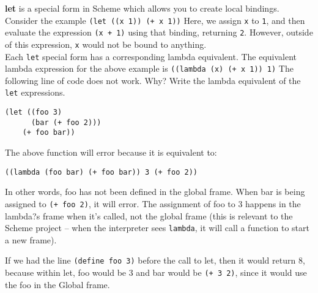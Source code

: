 \begin{blocksection}
\question
\textbf{let} is a special form in Scheme which allows you to create local bindings. Consider the example 
\newline
\newline
\texttt{(let ((x 1)) (+ x 1))}
\newline
\newline
Here, we assign \texttt{x} to \texttt{1}, and then evaluate the expression \texttt{(x + 1)} using that binding, returning \texttt{2}. However, outside of this expression, \texttt{x} would not be bound to anything. \\
Each \texttt{let} special form has a corresponding lambda equivalent. The equivalent lambda expression for the above example is 
\newline
\newline
\texttt{((lambda (x) (+ x 1)) 1)}
\newline
\newline
The following line of code does not work. Why? Write the lambda
equivalent of the \texttt{let} expressions.

\begin{lstlisting}
(let ((foo 3)
      (bar (+ foo 2)))
    (+ foo bar))
\end{lstlisting}
\begin{solution}[0.5in]
The above function will error because it is equivalent to:
\begin{lstlisting}
((lambda (foo bar) (+ foo bar)) 3 (+ foo 2))
\end{lstlisting}

In other words, foo has not been defined in the global frame. When bar is being
assigned to \texttt{(+ foo 2)}, it will error. The assignment of foo to 3
happens in the lambda?s frame when it's called, not the global frame (this is
relevant to the Scheme project -- when the interpreter sees \texttt{lambda}, it
will call a function to start a new frame).

If we had the line \texttt{(define foo 3)} before the call to let, then it would
return 8, because within let, foo would be 3 and bar would be \texttt{(+ 3 2)},
since it would use the foo in the Global frame.
\end{solution}

\end{blocksection}
